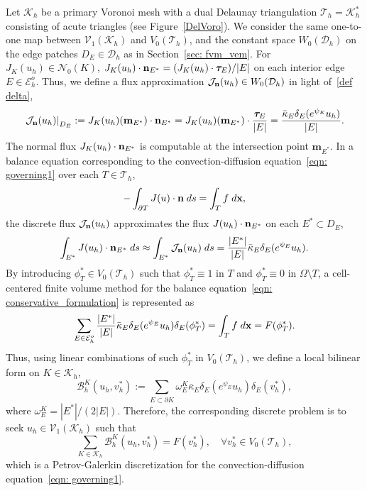 \documentclass[a4paper]{article}
\theoremstyle{plain}
\theoremstyle{definition}
\numberwithin{equation}{section}
\newcommand{\bx}{{\bf x}}
\newcommand{\bn}{{\bf n}}
\newcommand{\Th}{\mathcal{T}_h}
\newcommand{\Kh}{\mathcal{K}_h}
\newcommand{\Eho}{\mathcal{E}_h^o}
\begin{document}
Let $\Kh$ be a primary Voronoi mesh with a dual Delaunay triangulation $\Th=\mathcal{K}_h^*$ consisting of acute triangles (see Figure~\ref{DelVoro}).
We consider the same one-to-one map between $\mathcal V_1(\mathcal{K}_h)$ and $V_0(\Th)$, and the constant space $W_0(\mathcal{D}_h)$ on the edge patches $D_E\in\mathcal{D}_h$ as in Section~\ref{sec: fvm_vem}.
For $J_K(u_h)\in\mathcal{N}_0(K)$, $J_K(u_h)\cdot\bn_{E^*}=(J_K(u_h)\cdot\bm{\tau}_E)/|E|$ on each interior edge $E\in\Eho$.
Thus, we define a flux approximation $\mathcal{J}_{\bn}(u_h)\in W_0(\mathcal{D}_h)$ in light of~\eqref{def delta},
\begin{equation}
\left.\mathcal{J}_{\bn}(u_h)\right|_{D_E}:= J_K(u_h)(\mathbf{m}_{E^*})\cdot \bn_{E^*} =J_K(u_h)(\mathbf{m}_{E^*})\cdot \frac{\bm{\tau}_E}{|E|}= \frac{\bar{\kappa}_E\delta_E(e^{\psi_E}u_h)}{|E|}.\label{eqn: definition of J and G}
\end{equation}
The normal flux $J_K(u_h)\cdot \bn_{E^*}$ is computable at the intersection point $\mathbf{m}_{E^*}$. 
In a balance equation corresponding to the convection-diffusion equation~\eqref{eqn: governing1} over each $T\in \Th$,
\begin{equation}
-\int_{\partial T}J(u)\cdot \bn\;{\rm d}s=\int_{T}f\;{\rm d}\bx,\label{eqn: conservative_formulation}
\end{equation}
the discrete flux $\mathcal{J}_{\bn}(u_h)$ approximates the flux $J(u_h)\cdot\bn_{E^*}$ on each $E^*\subset D_E$,
\begin{equation*}
\int_{E^*} J(u_h)\cdot \bn_{E^*}\;{\rm d}s\approx \int_{E^*}\mathcal{J}_{\bn}(u_h)\;{\rm d}s=\frac{|E^*|}{|E|}\bar{\kappa}_E\delta_E(e^{\psi_E}u_h).
\end{equation*}
By introducing $\phi_T^{*}\in V_0(\Th)$ such that $\phi_T^{*}\equiv 1$ in $T$ and $\phi_T^{*}\equiv 0$ in $\Omega\setminus T$, a cell-centered finite volume method for the balance equation~\eqref{eqn: conservative_formulation} is represented as
\begin{equation}
\sum_{E\in\Eho}\frac{|E^*|}{|E|}\bar{\kappa}_E\delta_E(e^{\psi_E}u_h)\delta_E(\phi_T^{*})=\int_{T}f\;{\rm d}\bx=F(\phi_T^{*}).\label{eqn: cell_fvm_local}
\end{equation}
Thus, using
linear combinations of such $\phi_T^{*}$ in $V_0(\Th)$,
we define a local bilinear form on $K\in\Kh$,
\begin{equation*}
\mathcal{B}_h^K(u_h, v_h^*):=\sum_{E\subset \partial K}\omega_E^K\bar{\kappa}_E\delta_E(e^{\psi_E}u_h)\delta_E(v_h^*),
\end{equation*}
where $\omega_E^K=|E^*|/(2|E|)$.
Therefore, the corresponding discrete problem is to seek $u_h\in \mathcal V_1(\Kh)$ such that
\begin{equation}
\sum_{K\in\Kh}\mathcal{B}_{h}^K(u_h,v_h ^*)=F(v_h^{*}),\quad\forall v_h^*\in V_0(\mathcal{T}_h^{}),\label{eqn: discrete problem_MEAVE}
\end{equation}
which is a Petrov-Galerkin discretization for the convection-diffusion equation~\eqref{eqn: governing1}.
\end{document}

